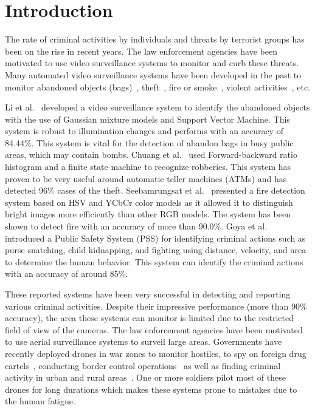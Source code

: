 \documentclass[10pt,twocolumn,letterpaper]{article}
\begin{document}
\section{Introduction}
The rate of criminal activities by individuals and threats by terrorist groups has been on the rise in recent years. The law enforcement agencies have been motivated to use video surveillance systems to monitor and curb these threats. Many automated video surveillance systems have been developed in the past to monitor abandoned objects (bags)~\cite{li2010abandoned}, theft~\cite{chuang2009carried}, fire or smoke~\cite{seebamrungsat2014fire}, violent activities~\cite{goya2009method}, etc.

Li et al.~\cite{li2010abandoned} developed a video surveillance system to identify the abandoned objects with the use of Gaussian mixture models and Support Vector Machine. This system is robust to illumination changes and performs with an accuracy of 84.44\%. This system is vital for the detection of abandon bags in busy public areas, which may contain bombs. Chuang et al.~\cite{chuang2009carried} used Forward-backward ratio histogram and a finite state machine to recognize robberies. This system has proven to be very useful around automatic teller machines (ATMs) and has detected 96\% cases of the theft. Seebamrungsat et al.~\cite{seebamrungsat2014fire} presented a fire detection system based on HSV and YCbCr color models as it allowed it to distinguish bright images more efficiently than other RGB models. The system has been shown to detect fire with an accuracy of more than 90.0\%. Goya et al.~\cite{goya2009method} introduced a Public Safety System (PSS) for identifying criminal actions such as purse snatching, child kidnapping, and fighting using distance, velocity, and area to determine the human behavior. This system can identify the criminal actions with an accuracy of around 85\%.

These reported systems have been very successful in detecting and reporting various criminal activities. Despite their impressive performance (more than 90\% accuracy), the area these systems can monitor is limited due to the restricted field of view of the cameras. The law enforcement agencies have been motivated to use aerial surveillance systems to surveil large areas. Governments have recently deployed drones in war zones to monitor hostiles, to spy on foreign drug cartels~\cite{ padgett2009drones}, conducting border control operations~\cite{ walters2010ucav} as well as finding criminal activity in urban and rural areas~\cite{ lewis2010cctv}. One or more soldiers pilot most of these drones for long durations which makes these systems prone to mistakes due to the human fatigue. 
\end{document}
